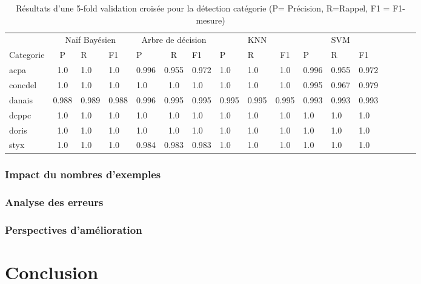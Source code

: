 \begin{table}[!h]
	\scriptsize
	\centering
	\begin{tabular}{l|c@{\hskip 0.1in}lllc@{\hskip 0.1in}lllc@{\hskip 0.1in}lllc@{\hskip 0.1in}lll}
		\hline\noalign{\smallskip}
		&   \multicolumn{3}{c}{Naïf Bayésien}    &    \multicolumn{3}{c}{Arbre de décision}   &  \multicolumn{3}{c}{KNN}  & \multicolumn{3}{c}{SVM}     \\       
		\noalign{\smallskip}
		\hline
		\noalign{\smallskip}
		Categorie  & P     & R     & F1    & P     & R     & F1    & P     & R     & F1    & P     & R     & F1    \\        
		\noalign{\smallskip}
		\hline
		\noalign{\smallskip}
		acpa    & 1.0 & 1.0 & 1.0 & 0.996 & 0.955 & 0.972 & 1.0 & 1.0 & 1.0 & 0.996 & 0.955 & 0.972 \\
		concdel & 1.0 & 1.0 & 1.0 & 1.0 & 1.0 & 1.0 & 1.0 & 1.0 & 1.0 & 0.995 & 0.967 & 0.979 \\
		danais  & 0.988 & 0.989 & 0.988 & 0.996 & 0.995 & 0.995 & 0.995 & 0.995 & 0.995 & 0.993 & 0.993 & 0.993 \\
		dcppc   & 1.0 & 1.0 & 1.0 & 1.0 & 1.0 & 1.0 & 1.0 & 1.0 & 1.0 & 1.0 & 1.0 & 1.0 \\
		doris   & 1.0 & 1.0 & 1.0 & 1.0 & 1.0 & 1.0 & 1.0 & 1.0 & 1.0 & 1.0 & 1.0 & 1.0 \\
		styx    & 1.0 & 1.0 & 1.0 & 0.984 & 0.983 & 0.983 & 1.0 & 1.0 & 1.0 & 1.0 & 1.0 & 1.0 \\
		\hline
	\end{tabular}
	\caption{Résultats d'une 5-fold validation croisée pour la détection catégorie  (P= Précision, R=Rappel, F1 = F1-mesure)}\label{tab:quanta:resultat-detect-cat}
\end{table}

\subsubsection{Impact du nombres d'exemples}
\subsubsection{Analyse des erreurs}
\subsubsection{Perspectives d'amélioration}

\section{Conclusion}
\label{sec:quanta:conclusion}


